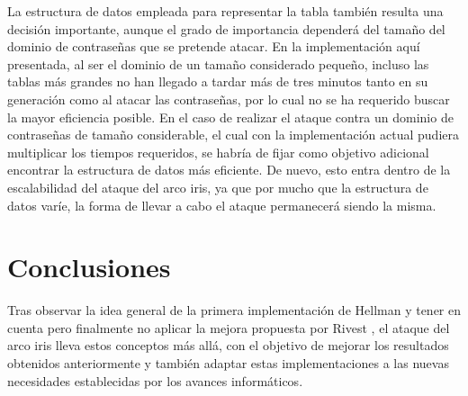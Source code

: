 \documentclass[12pt,spanish,listoffigures,listoftables]{tfgetsinf}
\begin{document}
La estructura de datos empleada para representar la tabla también resulta una decisión importante, aunque el grado de importancia dependerá del tamaño del dominio de contraseñas que se pretende atacar. En la implementación aquí presentada, al ser el dominio de un tamaño considerado pequeño, incluso las tablas más grandes no han llegado a tardar más de tres minutos tanto en su generación como al atacar las contraseñas, por lo cual no se ha requerido buscar la mayor eficiencia posible. En el caso de realizar el ataque contra un dominio de contraseñas de tamaño considerable, el cual con la implementación actual pudiera multiplicar los tiempos requeridos, se habría de fijar como objetivo adicional encontrar la estructura de datos más eficiente. De nuevo, esto entra dentro de la escalabilidad del ataque del arco iris, ya que por mucho que la estructura de datos varíe, la forma de llevar a cabo el ataque permanecerá siendo la misma.


\chapter{Conclusiones}

Tras observar la idea general de la primera implementación de Hellman \cite{hellman} y tener en cuenta pero finalmente no aplicar la mejora propuesta por Rivest \cite{rivest}, el ataque del arco iris lleva estos conceptos más allá, con el objetivo de mejorar los resultados obtenidos anteriormente y también adaptar estas implementaciones a las nuevas necesidades establecidas por los avances informáticos.
\end{document}
